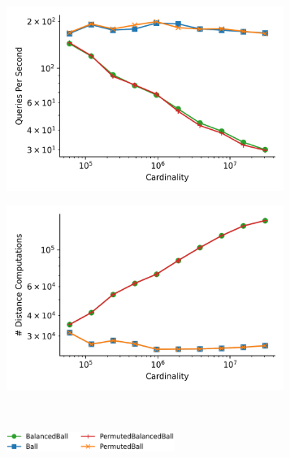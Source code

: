 \begin{figure}
    \begin{subfigure}[b]{0.5\textwidth}
        \includegraphics[width=0.99\textwidth]{images/distance_counts/fashion-mnist_KnnDepthFirst_10_throughput.png}
        \label{fig:results:silva-counts-throughput}
    \end{subfigure}%
    \begin{subfigure}[b]{0.5\textwidth}
        \includegraphics[width=0.99\textwidth]{images/distance_counts/fashion-mnist_KnnDepthFirst_10_counts.png}
        \label{fig:results:radioml-counts-counts}
    \end{subfigure}%
    \\
    \begin{subfigure}[b]{0.94\textwidth}
        \centering
        \includegraphics[width=0.6\textwidth]{images/distance_counts/legend.png}

\end{subfigure}
\end{figure}
